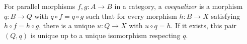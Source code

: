 
For parallel morphisms $f,g:A\to B$ in a category, a \emph{coequalizer} is a morphism $q:B\to Q$ with $q\circ f=q\circ g$ such that for every morphism $h:B\to X$ satisfying $h\circ f=h\circ g$, there is a unique $u:Q\to X$ with $u\circ q=h$. If it exists, this pair $(Q,q)$ is unique up to a unique isomorphism respecting $q$.
